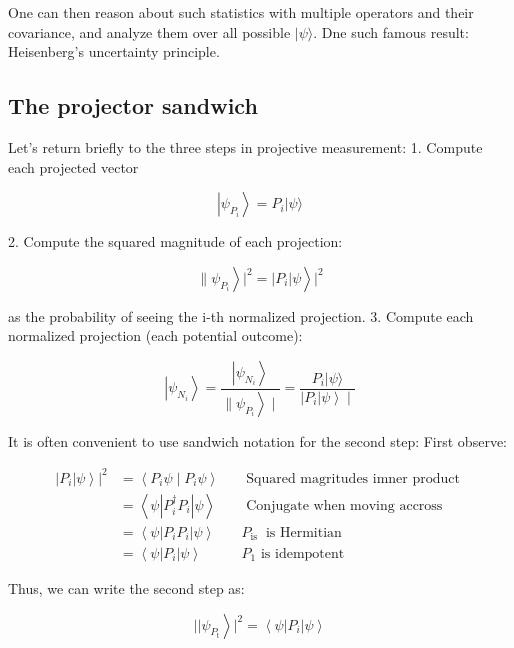 \documentclass[main.tex]{subfiles}
\begin{document}
    One can then reason about such statistics with multiple operators and their covariance, and analyze them over all possible $|\psi\rangle$. Dne such famous result: Heisenberg's uncertainty principle.

\subsection{The projector sandwich}

    Let's return briefly to the three steps in projective measurement: 1. Compute each projected vector
    
    $$
    \left|\psi_{P_{i}}\right\rangle=P_{i}|\psi\rangle
    $$
    
    2. Compute the squared magnitude of each projection:
    
    $$
    \left.\left.\| \psi_{P_{i}}\right\rangle\left.\right|^{2}=\left|P_{i}\right| \psi\right\rangle\left.\right|^{2}
    $$
    
    as the probability of seeing the i-th normalized projection. 3. Compute each normalized projection (each potential outcome):
    
    $$
    \left|\psi_{N_{i}}\right\rangle=\frac{\left|\psi_{N_{i}}\right\rangle}{\left.\| \psi_{P_{i}}\right\rangle \mid}=\frac{P_{i}|\psi\rangle}{\left.\left|P_{i}\right| \psi\right\rangle \mid}
    $$
    
    It is often convenient to use sandwich notation for the second step: First observe:
    
    $$
    \begin{aligned}
    \left.\left|P_{i}\right| \psi\right\rangle\left.\right|^{2} &=\left\langle P_{i} \psi \mid P_{i} \psi\right\rangle & & \text { Squared magritudes imner product } \\
    &=\left\langle\psi\left|P_{i}^{\dagger} P_{i}\right| \psi\right\rangle & & \text { Conjugate when moving accross } \\
    &=\left\langle\psi\left|P_{i} P_{i}\right| \psi\right\rangle & & P_{\text {is }} \text { is Hermitian } \\
    &=\left\langle\psi\left|P_{i}\right| \psi\right\rangle & & P_{1} \text { is idempotent }
    \end{aligned}
    $$
    
    Thus, we can write the second step as:
    
    $$
    \left.|| \psi_{P_{\mathrm{t}}}\right\rangle\left.\right|^{2}=\left\langle\psi\left|P_{i}\right| \psi\right\rangle
    $$
    
\end{document}
